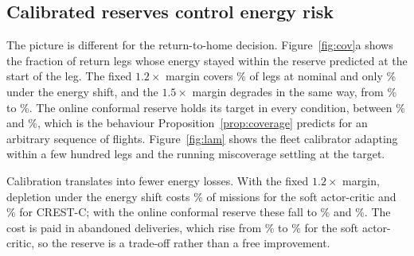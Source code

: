 \subsection*{Calibrated reserves control energy risk}

The picture is different for the return-to-home decision. Figure~\ref{fig:cov}a shows the fraction of return legs whose energy stayed within the reserve predicted at the start of the leg. The fixed \(1.2\times\) margin covers \RCrestcStdCovNominal\% of legs at nominal and only \RCrestcStdCovEnergy\% under the energy shift, and the \(1.5\times\) margin degrades in the same way, from \RCrestcStdfifteenCovNominal\% to \RCrestcStdfifteenCovEnergy\%. The online conformal reserve holds its target in every condition, between \RCrestcOnlineCovNominal\% and \RCrestcOnlineCovTraffic\%, which is the behaviour Proposition~\ref{prop:coverage} predicts for an arbitrary sequence of flights. Figure~\ref{fig:lam} shows the fleet calibrator adapting within a few hundred legs and the running miscoverage settling at the target.

Calibration translates into fewer energy losses. With the fixed \(1.2\times\) margin, depletion under the energy shift costs \RSacStdDepEnergy\% of missions for the soft actor-critic and \RCrestcStdDepEnergy\% for CREST-C; with the online conformal reserve these fall to \RSacOnlineDepEnergy\% and \RCrestcOnlineDepEnergy\%. The cost is paid in abandoned deliveries, which rise from \RSacStdRthEnergy\% to \RSacOnlineRthEnergy\% for the soft actor-critic, so the reserve is a trade-off rather than a free improvement.

